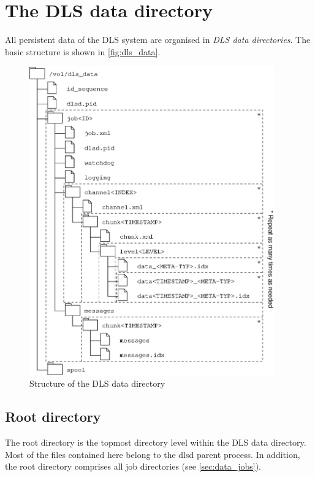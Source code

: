 \documentclass[a4paper,12pt,BCOR6mm,bibtotoc,idxtotoc]{scrbook}
\begin{document}

\chapter{The DLS data directory}
\label{sec:data}

All persistent data of the DLS system are organised in \textit{DLS data
directories}. The basic structure is shown in
\autoref{fig:dls_data}.

\begin{figure}[htb] \begin{center} \includegraphics[width=300pt]{bilder/dls_data_en} \end{center} \caption{Structure of the DLS data directory} \label{fig:dls_data} \end{figure}


\section{Root directory}
\label{sec:data_root}

The root directory is the topmost directory level within the DLS data
directory. Most of the files contained here belong to the dlsd parent process.
In addition, the root directory comprises all job directories (see
\autoref{sec:data_jobs}).
\end{document}

